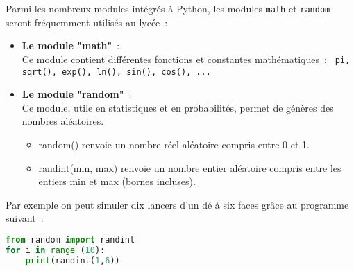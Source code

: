 Parmi les nombreux modules intégrés à Python, les modules \texttt{math} et \texttt{random} seront fréquemment utilisés au lycée~:
\begin{itemize}
     \item
     \textbf{Le module "math"}~:
     \\
     Ce module contient différentes fonctions et constantes mathématiques~: \texttt{ pi, sqrt(), exp(), ln(), sin(), cos(), ...}
     \item
     \textbf{Le module "random"}~:
     \\
     Ce module, utile en statistiques et en probabilités, permet de génères des nombres aléatoires.
     \begin{itemize}
          \item
          random() renvoie un nombre réel aléatoire compris entre 0 et 1.
          \item
          randint(min, max) renvoie un nombre entier aléatoire compris entre les entiers min et max (bornes incluses).
     \end{itemize}
\end{itemize}
Par exemple on peut simuler dix lancers d'un dé à six faces grâce au programme suivant~:
  \begin{lstlisting}[language=Python]
from random import randint
for i in range (10):
    print(randint(1,6))
\end{lstlisting}
